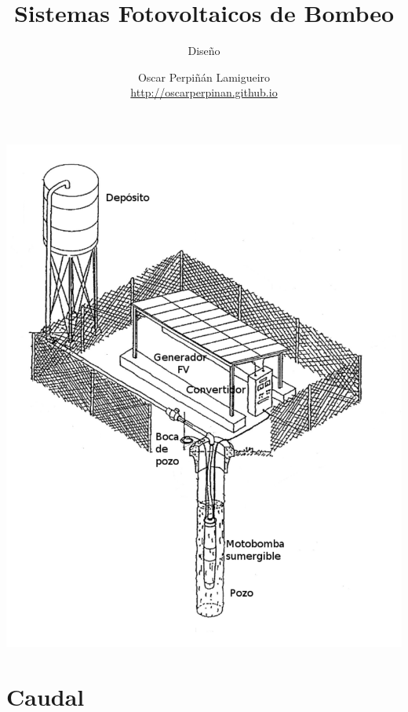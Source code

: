 \documentclass[xcolor={usenames,svgnames,dvipsnames}]{beamer}
\author{Oscar Perpiñán Lamigueiro \\ \url{http://oscarperpinan.github.io}}
\date{}
\title{Sistemas Fotovoltaicos de Bombeo}
\subtitle{Diseño}
\begin{document}
\maketitle

\begin{frame}[label={sec:org9c11691}]{}
\begin{center}
\begin{center}
\includegraphics[height=0.9\textheight]{../figs/EsquemaBombeo_oscar.pdf}
\end{center}
\end{center}
\end{frame}


\section{Caudal}
\label{sec:orgdeee2f0}
\end{document}
